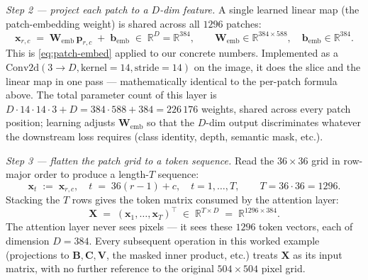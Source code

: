 \documentclass[11pt,a4paper]{article}
\begin{document}
\medskip
\noindent\emph{Step 2 — project each patch to a $D$-dim feature.}
A single learned linear map (the patch-embedding weight) is shared
across all $1296$ patches:
\begin{equation}\label{eq:self-worked-embed}
  \bm{x}_{r,c}
   \;=\; \bm{W}_{\text{emb}}\,\bm{p}_{r,c} \;+\; \bm{b}_{\text{emb}}
   \;\in\;\mathbb{R}^{D} = \mathbb{R}^{384},
  \qquad
  \bm{W}_{\text{emb}}\in\mathbb{R}^{384\times 588},
  \quad
  \bm{b}_{\text{emb}}\in\mathbb{R}^{384}.
\end{equation}
This is \eqref{eq:patch-embed} applied to our concrete numbers. Implemented as
a $\mathrm{Conv2d}(3{\to}D, \text{kernel}{=}14, \text{stride}{=}14)$
on the image, it does the slice and the linear map in one pass —
mathematically identical to the per-patch formula above. The total
parameter count of this layer is $D \cdot 14\!\cdot\!14\!\cdot\!3 + D
= 384 \cdot 588 + 384 = 226\,176$ weights, shared across every patch
position; learning adjusts $\bm{W}_{\text{emb}}$ so that the
$D$-dim output discriminates whatever the downstream loss requires
(class identity, depth, semantic mask, etc.).

\medskip
\noindent\emph{Step 3 — flatten the patch grid to a token sequence.}
Read the $36\!\times\!36$ grid in row-major order to produce a length-$T$
sequence:
\begin{equation}
  \bm{x}_t \;:=\; \bm{x}_{r,c},\quad t \;=\; 36(r{-}1) + c,\quad t = 1, \dots, T,
  \qquad
  T = 36 \cdot 36 = 1296.
\end{equation}
Stacking the $T$ rows gives the token matrix consumed by the
attention layer:
\begin{equation}
  \bm{X}\;=\;(\bm{x}_1, \dots, \bm{x}_T)^\top
   \;\in\; \mathbb{R}^{T \times D} \;=\; \mathbb{R}^{1296 \times 384}.
\end{equation}
The attention layer never sees pixels — it sees these $1296$ token
vectors, each of dimension $D = 384$. Every subsequent
operation in this worked example (projections to $\bm{B}, \bm{C},
\bm{V}$, the masked inner product, etc.) treats $\bm{X}$ as its
input matrix, with no further reference to the original
$504\!\times\!504$ pixel grid.
\end{document}
